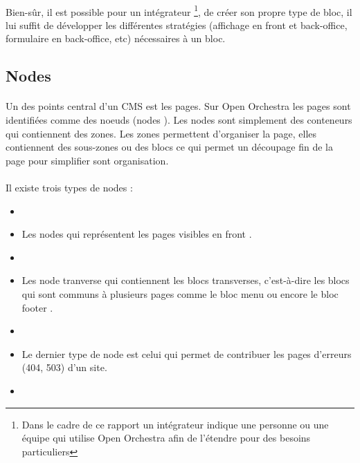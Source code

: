 	      \paragraph{}
	      	 Bien-sûr, il est possible pour un intégrateur \footnote{Dans le cadre de ce rapport un intégrateur indique une personne ou une équipe qui utilise Open Orchestra afin de  l'étendre pour des besoins particuliers}, de créer son propre type de bloc, il lui suffit de développer les différentes stratégies (affichage en front et back-office, formulaire en back-office, etc) nécessaires à un bloc.  
         \subsection{Nodes}
         \paragraph{}
         Un des points central d'un CMS est les pages. Sur Open Orchestra les pages sont identifiées comme des noeuds (\og nodes \fg{}).
          Les nodes sont simplement des conteneurs qui contiennent des zones. Les zones permettent d'organiser la page, elles contiennent des sous-zones ou des blocs ce qui permet un découpage fin de la page pour simplifier sont organisation. 
         \paragraph{}
         Il existe trois types de nodes : 
         \begin{itemize}
         \item[]
         \item  Les nodes qui représentent les pages visibles en \og front \fg{}.
          \item[]
         \item  Les \og node tranverse \fg{} qui contiennent les blocs transverses, c'est-à-dire les blocs qui sont communs à plusieurs pages comme le bloc \og menu \fg{} ou encore le bloc \og footer \fg{}.
          \item[]
         \item Le dernier type de node est celui qui permet de contribuer les pages d'erreurs (404, 503) d'un site.
         \item[]
         \end{itemize}
